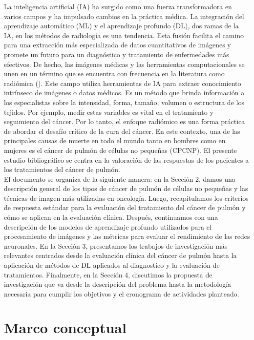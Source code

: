 \documentclass[11pt,a4paper,openany]{article}
\begin{document}
La inteligencia artificial (IA) ha surgido como una fuerza transformadora en varios campos y ha impulsado cambios en la práctica médica. La integración del aprendizaje automático (ML) y el aprendizaje profundo (DL), dos ramas de la IA, en los métodos de radiología es una tendencia. Esta fusión facilita el camino para una extracción más especializada de datos cuantitativos de imágenes y promete un futuro para un diagnóstico y tratamiento de enfermedades más efectivos. De hecho, las imágenes médicas y las herramientas computacionales se unen en un término que se encuentra con frecuencia en la literatura como radiómica (\cite{Lambin2017}). Este campo utiliza herramientas de IA para extraer conocimiento intrínseco de imágenes o datos médicos. Es un método que brinda información a los especialistas sobre la intensidad, forma, tamaño, volumen o estructura de los tejidos. Por ejemplo, medir estas variables es vital en el tratamiento y seguimiento del cáncer. Por lo tanto, el enfoque radiómico es una forma práctica de abordar el desafío crítico de la cura del cáncer. En este contexto, una de las principales causas de muerte en todo el mundo tanto en hombres como en mujeres es el cáncer de pulmón de células no pequeñas (CPCNP). El presente estudio bibliográfico se centra en la valoración de las respuestas de los pacientes a los tratamientos del cáncer de pulmón. \\

El documento se organiza de la siguiente manera: en la Sección 2, damos una descripción general de los tipos de cáncer de pulmón de células no pequeñas y las técnicas de imagen más utilizadas en oncología. Luego, recapitulamos los criterios de respuesta estándar para la evaluación del tratamiento del cáncer de pulmón y cómo se aplican en la evaluación clínica. Después, continuamos con una descripción de los modelos de aprendizaje profundo utilizados para el procesamiento de imágenes y las métricas para evaluar el rendimiento de las redes neuronales. En la Sección 3, presentamos los trabajos de investigación más relevantes centrados desde la evaluación clínica del cáncer de pulmón hasta la aplicación de métodos de DL aplicados al diagnostico y la evaluación de tratamientos. Finalmente, en la Sección 4, discutimos la propuesta de investigación que va desde la descripción del problema hasta la metodología necesaria para cumplir los objetivos y el cronograma de actividades planteado.

\section{Marco conceptual}
\end{document}
